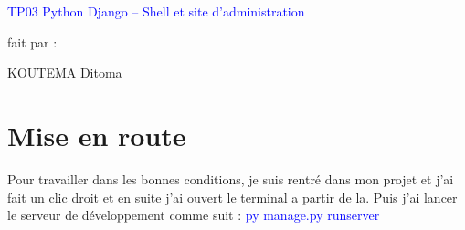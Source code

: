 \documentclass[10pt,a4paper]{article}
\author{KOUTEMA Ditoma}
\begin{document}

\begin{shadedbox}
\begin{center}
\huge \textcolor{blue}{TP03 Python Django – Shell et site d'administration}
\end{center}
\end{shadedbox}
\large{\begin{center}
fait par : 
\end{center}}
\begin{center}
\huge{KOUTEMA Ditoma}
\end{center}
\newpage
\tableofcontents
\newpage

\section{Mise en route}
Pour travailler dans les bonnes conditions, je suis rentré dans mon projet et j'ai fait un clic droit et en suite j'ai ouvert le terminal a partir de la. Puis j'ai lancer le serveur de développement comme suit : \textcolor{blue}{py manage.py runserver}
\end{document}
